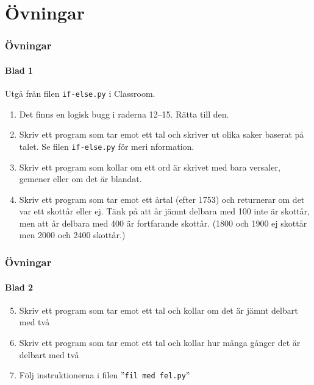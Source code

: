 \documentclass[aspectratio=169]{beamer}
\begin{document}
\section{Övningar}

\begin{frame}[fragile]
	\frametitle{Övningar}
	\framesubtitle{Blad 1}
	
	Utgå från filen \texttt{if-else.py} i Classroom.

	\begin{enumerate}
		\item Det finns en logisk bugg i raderna 12--15. Rätta till den.
		\item Skriv ett program som tar emot ett tal och skriver ut olika saker baserat på talet. Se filen \texttt{if-else.py} för meri nformation.
		\item Skriv ett program som kollar om ett ord är skrivet med bara versaler, gemener eller om det är blandat.
		\item Skriv ett program som tar emot ett årtal (efter 1753) och returnerar om det var ett skottår eller ej. Tänk på att år jämnt delbara med 100 inte är skottår, men att år delbara med 400 är fortfarande skottår. (1800 och 1900 ej skottår men 2000 och 2400 skottår.)
	\end{enumerate}

\end{frame}


\begin{frame}
	\frametitle{Övningar}
	\framesubtitle{Blad 2}
	
	\begin{enumerate}
		\setcounter{enumi}{4}
		\item Skriv ett program som tar emot ett tal och kollar om det är jämnt delbart med två
		\item Skriv ett program som tar emot ett tal och kollar hur många gånger det är delbart med två
		\item Följ instruktionerna i filen ''\texttt{fil med fel.py}''
	\end{enumerate}

\end{frame}
\end{document}
